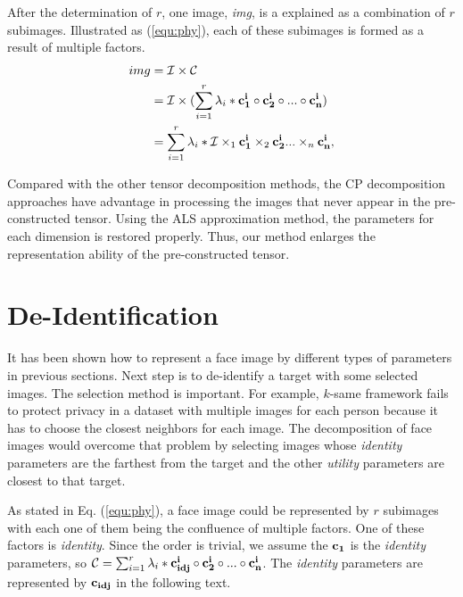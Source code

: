     After the determination of $r$, one image, {\it img}, is a explained as a combination of $r$ subimages. Illustrated
    as (\ref{equ:phy}), each of these subimages is formed
    as a result of multiple factors. 
    \begin{equation}
      \label{equ:phy}
      \begin{aligned}
        img & = \mathcal{I} \times \mathcal{C} \\  
          & = \mathcal{I} \times (\sum_{i=1}^{r} \lambda_i * {\bf c_1^i} \circ {\bf c_2^i} \circ...\circ {\bf c_n^i}) \\
          & = \sum_{i=1}^{r} \lambda_i * \mathcal{I} \times_1 {\bf c_1^i} \times_2 {\bf c_2^i} ... \times_n {\bf c_n^i}, 
      \end{aligned}
    \end{equation}

    Compared with the other tensor decomposition methods, the CP decomposition approaches
    have advantage in processing the images that never appear in the pre-constructed
    tensor. Using the ALS approximation method, the parameters for each dimension is
    restored properly. Thus, our method enlarges the representation ability of the 
    pre-constructed tensor.

    \section{De-Identification}
    It has been shown how to represent a face image by different types of parameters in previous sections. 
    Next step is to de-identify a target with some selected images. The selection method is important. For
    example, $k$-same framework fails to protect privacy in a dataset with multiple images for each person
    because it has to 
    choose the closest neighbors for each image. The decomposition of face images would overcome that
    problem by selecting images whose {\it identity} parameters are the farthest from the target and the 
    other {\it utility} parameters are closest to that target.

    As stated in Eq. (\ref{equ:phy}), a face image could be represented by $r$ subimages with each one
    of them being the confluence of multiple factors. One of these factors is {\it identity}. Since the
    order is trivial, we assume the ${\bf c_1}$ is the {\it identity} parameters, so
    $\mathcal{C} = \sum_{i=1}^{r}\lambda_i * {\bf c_{idj}^i} \circ {\bf c_2^i} \circ...\circ {\bf c_n^i}$.
    The {\it identity} parameters are represented by ${\bf c_{idj} }$ in the following text.

